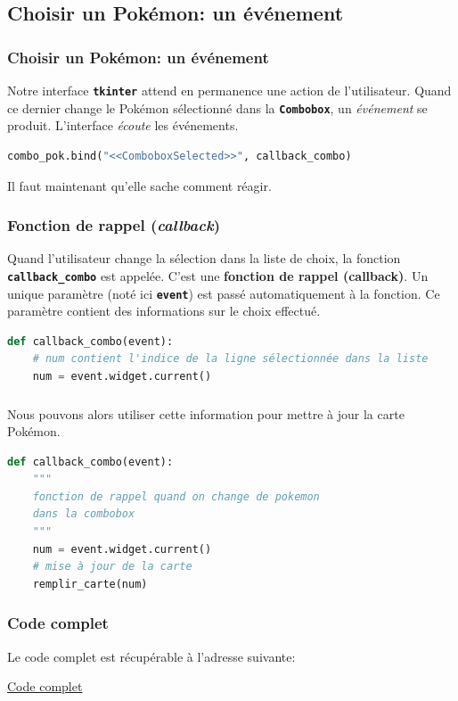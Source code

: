 \documentclass[svgnames,11pt]{beamer}
\begin{document}
\subsection{Choisir un Pokémon: un événement}
\begin{frame}[fragile]
    \frametitle{Choisir un Pokémon: un événement}

    Notre interface \texttt{\textbf{tkinter}} attend en permanence une action de l'utilisateur. Quand ce dernier change le Pokémon sélectionné dans la \textbf{\texttt{Combobox}}, un \emph{événement} se produit. L'interface \emph{écoute} les événements.

    \begin{center}
    \begin{lstlisting}[language=Python,basicstyle=\ttfamily\small,xleftmargin=0.3em,xrightmargin=-2em]
combo_pok.bind("<<ComboboxSelected>>", callback_combo)
\end{lstlisting}
    \label{CODE}
    \end{center}
Il faut maintenant qu'elle sache comment réagir.
\end{frame}
\begin{frame}[fragile]
    \frametitle{Fonction de rappel (\emph{callback})}

Quand l'utilisateur change la sélection dans la liste de choix, la fonction \textbf{\texttt{callback\_combo}} est appelée. C'est une \textbf{fonction de rappel (callback)}. Un unique paramètre (noté ici \textbf{\texttt{event}}) est passé automatiquement à la fonction. Ce paramètre contient des informations sur le choix effectué.
\begin{center}
\begin{lstlisting}[language=Python , basicstyle=\ttfamily\small, xleftmargin=1em, xrightmargin=1em]
def callback_combo(event):
    # num contient l'indice de la ligne sélectionnée dans la liste
    num = event.widget.current()
\end{lstlisting}
\label{CODE}
\end{center}
\end{frame}
\begin{frame}[fragile]
    \frametitle{}

Nous pouvons alors utiliser cette information pour mettre à jour la carte Pokémon.

\begin{center}
\begin{lstlisting}[language=Python , basicstyle=\ttfamily\small, xleftmargin=1em, xrightmargin=1em]
def callback_combo(event):
    """
    fonction de rappel quand on change de pokemon
    dans la combobox
    """
    num = event.widget.current()
    # mise à jour de la carte
    remplir_carte(num)
\end{lstlisting}
\end{center}

\end{frame}
\begin{frame}
    \frametitle{Code complet}

    Le code complet est récupérable à l'adresse suivante:
    \begin{center}
        \href{https://cviroulaud.github.io/premiere/donnees-table/pokemon/scripts/pokemon-correction.zip}{Code complet}
    \end{center}

\end{frame}
\end{document}
